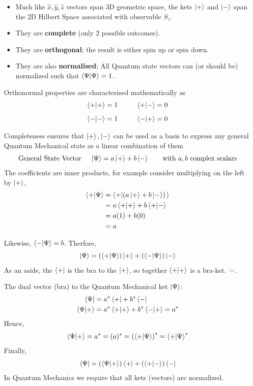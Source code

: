 \documentclass[english, 11pt]{article}
\begin{document}
         \begin{itemize}
            \item Much like $\hat{x}, \hat{y}, \hat{z}$ vectors span 3D geometric space, the kets $\left|+\right\rangle$ and $\left|-\right\rangle$ span the 2D Hilbert Space associated with observable $S_z$.
            \item They are \textbf{complete} (only 2 possible outcomes).
            \item They are \textbf{orthogonal}; the result is either spin up or spin down.
            \item They are also \textbf{normalised}; All Quantum state vectors can (or should be) normalized such that $\braket{\Psi}{\Psi} = 1$.
         \end{itemize}

         Orthonormal properties are characterised mathematically as
         \[ \braket{+}{+} = 1 \ \ \ \ \ \ \ \ \braket{+}{-} = 0 \]
         \[ \braket{-}{-} = 1 \ \ \ \ \ \ \ \ \braket{-}{+} = 0 \]

         Completeness ensures that $\left|+\right\rangle, \left|-\right\rangle$ can be used as a basis to express any general Quantum Mechanical state as a linear combination of them
         \[ \mbox{General State Vector \ \ \ } \left|\Psi\right\rangle = a\left|+\right\rangle + b\left|-\right\rangle \mbox{ \ \ \ \ \ with $a, b$ complex scalars}  \]
         The coefficients are inner products, for example consider multiplying on the left by $\left|+\right\rangle$,
         \begin{align*}
           \braket{+}{\Psi} & = \braket{+}{\left( a\ket{+}+b\ket{-} \right)} \\
                            & = a\braket{+}{+} + b\braket{+}{-} \\
                            & = a(1) + b(0) \\
                            & = a
         \end{align*}

         Likewise, $\braket{-}{\Psi} = b$. Therfore,
         \[ \kpsi = \left( \braket{+}{\Psi} \right)\ket{+} + \left( \braket{-}{\Psi} \right) \ket{-} \]
          As an aside, the $\left\langle+\right|$ is the bra to the $\left|+\right\rangle$, so together $\braket{+}{+}$ is a bra-ket. $\ddot\smile$.
          \newline

          The dual vector (bra) to the Quantum Mechanical ket $\left|\Psi\right\rangle$:
          \begin{align*}
            \bra{\Psi} & = a^*\bra{+} + b^*\bra{-} \\
            \braket{\Psi}{+} & = a^*\braket{+}{+} + b^*\braket{-}{+} = a^*
          \end{align*}
          Hence,
          \[ \braket{\Psi}{+} = a^* = (a)^* = \left( \braket{+}{\Psi} \right)^* = \braket{+}{\Psi}^* \]
          Finally,
          \[ \bra{\Psi} = \left( \braket{\Psi}{+} \right) \bra{+} + \left( \braket{+}{-} \right)\bra{-} \]
          In Quantum Mechanics we require that all kets (vectors) are normalized.
\end{document}
